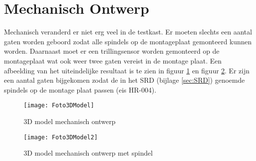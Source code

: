 \section{Mechanisch Ontwerp}

Mechanisch veranderd er niet erg veel in de testkast. Er moeten slechts een aantal gaten worden geboord zodat alle spindels op de montageplaat gemonteerd kunnen worden. Daarnaast moet er een trillingsensor worden gemonteerd op de montageplaat wat ook weer twee gaten vereist in de montage plaat. Een afbeelding van het uiteindelijke resultaat is te zien in figuur \ref{fig:MechanischOntwerp} en figuur \ref{fig:MechanischOntwerp2}. Er zijn een aantal gaten bijgekomen zodat de in het \gls{SRD} (bijlage \ref{sec:SRD}) genoemde spindels op de montage plaat passen (eis HR-004).

\begin{figure}[H]
	\centering
	\texttt{[image: Foto3DModel]}
	\caption{3D model mechanisch ontwerp}
	\label{fig:MechanischOntwerp}
\end{figure}

\begin{figure}[H]
	\centering
	\texttt{[image: Foto3DModel2]}
	\caption{3D model mechanisch ontwerp met spindel}
	\label{fig:MechanischOntwerp2}
\end{figure}